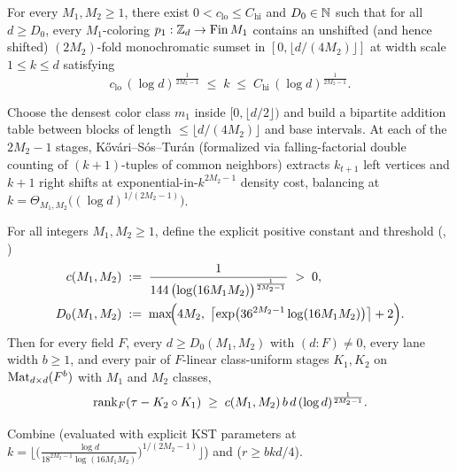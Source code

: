 \begin{lemma}\label{lem:kst-sumset}
For every $M_1, M_2 \ge 1$, there exist $0 < c_{\mathrm{lo}} \le C_{\mathrm{hi}}$ and $D_0 \in \mathbb{N}$
such that for all $d \ge D_0$, every $M_1$-coloring $p_1 : \mathbb{Z}_d \to \mathrm{Fin}\,M_1$ contains an
unshifted (and hence shifted) $(2M_2)$-fold monochromatic sumset in $[0, \lfloor d/(4M_2)\rfloor]$
at width scale $1 \le k \le d$ satisfying
\[
  c_{\mathrm{lo}}\,(\log d)^{\frac{1}{2M_2 - 1}} \;\le\; k \;\le\;
  C_{\mathrm{hi}}\,(\log d)^{\frac{1}{2M_2 - 1}}.
\]
\end{lemma}
\begin{outline}
Choose the densest color class $m_1$ inside $[0, \lfloor d/2\rfloor)$ and build a bipartite
addition table between blocks of length $\le \lfloor d/(4M_2)\rfloor$ and base intervals. At each of
the $2M_2 - 1$ stages, K\H{o}v\'ari--S\'os--Tur\'an \cite{KovariSosTuran1954} (formalized via
falling-factorial double counting of $(k+1)$-tuples of common neighbors) extracts $k_{t+1}$ left
vertices and $k + 1$ right shifts at exponential-in-$k^{2M_2-1}$ density cost, balancing at
$k = \Theta_{M_1,M_2}\bigl((\log d)^{1/(2M_2-1)}\bigr)$.
\end{outline}

\begin{theorem}\label{thm:2b}
For all integers $M_1, M_2 \ge 1$, define the explicit positive constant and threshold
(, )
\begin{align*}
  c(M_1, M_2) &\;:=\; \frac{1}{144\,\bigl(\log(16 M_1 M_2)\bigr)^{\frac{1}{2M_2 - 1}}} \;>\; 0, \\
  D_0(M_1, M_2) &\;:=\; \max\!\Bigl(4M_2,\; \bigl\lceil \exp\bigl(36^{2M_2-1}\log(16 M_1 M_2)\bigr)\bigr\rceil + 2\Bigr).
\end{align*}
Then for every field $F$, every $d \ge D_0(M_1,M_2)$ with $(d : F) \ne 0$, every lane width
$b \ge 1$, and every pair of $F$-linear class-uniform stages $K_1, K_2$ on $\operatorname{Mat}_{d\times d}(F^b)$
with $M_1$ and $M_2$ classes,
\[
  \operatorname{rank}_F(\tau - K_2 \circ K_1)
  \;\ge\;
  c(M_1, M_2)\,b\,d\,(\log d)^{\frac{1}{2M_2 - 1}}.
\]
\end{theorem}
\begin{outline}
Combine  (evaluated with explicit KST parameters at
$k = \bigl\lfloor \bigl(\frac{\log d}{18^{2M_2-1}\log(16M_1 M_2)}\bigr)^{1/(2M_2-1)}\bigr\rfloor$)
and  ($r \ge b k d / 4$).
\end{outline}

